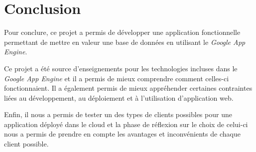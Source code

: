 \chapter{Conclusion}
Pour conclure, ce projet a permis de développer une application fonctionnelle permettant de mettre en valeur une base de données en utilisant le \textit{Google App Engine}.

Ce projet a été source d'enseignements pour les technologies incluses dans le \textit{Google App Engine} et il a permis de mieux comprendre comment celles-ci fonctionnaient. Il a également permis de mieux appréhender certaines contraintes liées au développement, au déploiement et à l'utilisation d'application web.

Enfin, il nous a permis de tester un des types de clients possibles pour une application déployé dans le cloud et la phase de réflexion sur le choix de celui-ci nous a permis de prendre en compte les avantages et inconvénients de chaque client possible.